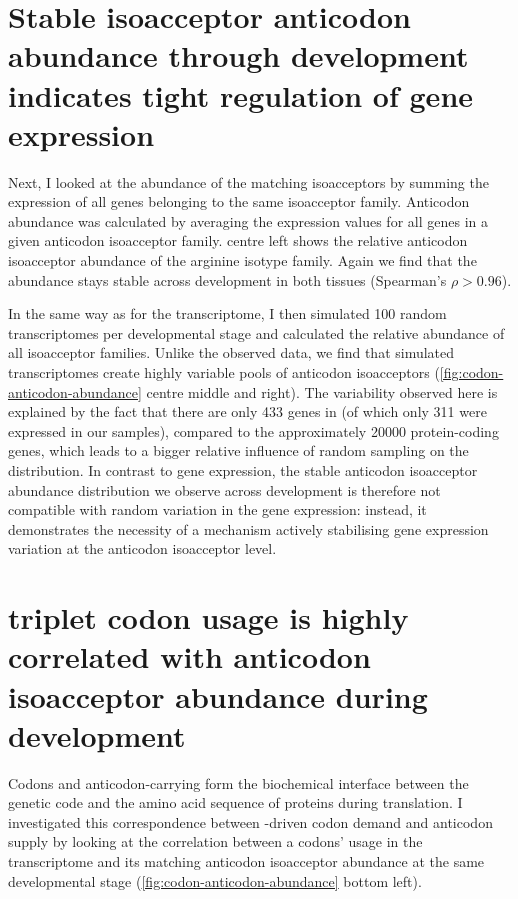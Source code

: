 \section{Stable isoacceptor anticodon abundance through development indicates
tight regulation of  gene expression}

Next, I looked at the abundance of the matching \trna isoacceptors by summing
the expression of all \trna genes belonging to the same isoacceptor family.
Anticodon abundance was calculated by averaging the expression values for all
\trna genes in a given anticodon isoacceptor family.
 centre left shows the relative anticodon
isoacceptor abundance of the arginine isotype family. Again we find that the
abundance stays stable across development in both tissues (Spearman’s \(\rho >
0.96\)).

In the same way as for the \mrna transcriptome, I then simulated \num{100}
random \trna transcriptomes per developmental stage and calculated the relative
abundance of all isoacceptor families. Unlike the observed \trna data, we find
that simulated \trna transcriptomes create highly variable pools of anticodon
isoacceptors (\cref{fig:codon-anticodon-abundance} centre middle and right). The
variability observed here is explained by the fact that there are only \num{433}
\trna genes in \mmu (of which only \num{311} were expressed in our samples),
compared to the approximately \num{20000} protein-coding genes, which leads to a
bigger relative influence of random sampling on the distribution. In contrast to
\mrna gene expression, the stable anticodon isoacceptor abundance distribution
we observe across development is therefore not compatible with random variation
in the \trna gene expression: instead, it demonstrates the necessity of a
mechanism actively stabilising \trna gene expression variation at the anticodon
isoacceptor level.

\section{ triplet codon usage is highly correlated with 
anticodon isoacceptor abundance during development}

Codons and anticodon-carrying \trna[s] form the biochemical interface between
the genetic code and the amino acid sequence of proteins during \mrna
translation. I investigated this correspondence between \mrna-driven codon
demand and \trna anticodon supply by looking at the correlation between a
codons’ usage in the \mrna transcriptome and its matching \trna anticodon
isoacceptor abundance at the same developmental stage
(\cref{fig:codon-anticodon-abundance} bottom left).

